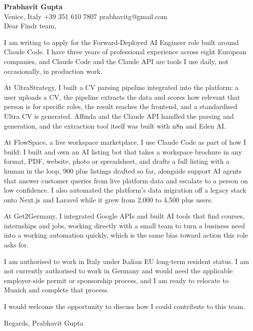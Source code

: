 \documentclass[a4paper,10.5pt]{article}
\begin{document}
\textbf{Prabhavit Gupta}\\
Venice, Italy \textbar{} +39 351 610 7807 \textbar{} prabhavitg@gmail.com\\[10pt]
Dear Findr team,

I am writing to apply for the Forward-Deployed AI Engineer role built around Claude Code. I have three years of professional experience across eight European companies, and Claude Code and the Claude API are tools I use daily, not occasionally, in production work.

At UltraStrategy, I built a CV parsing pipeline integrated into the platform: a user uploads a CV, the pipeline extracts the data and scores how relevant that person is for specific roles, the result reaches the frontend, and a standardised Ultra CV is generated. Affinda and the Claude API handled the parsing and generation, and the extraction tool itself was built with n8n and Eden AI.

At FlowSpace, a live workspace marketplace, I use Claude Code as part of how I build: I built and own an AI listing bot that takes a workspace brochure in any format, PDF, website, photo or spreadsheet, and drafts a full listing with a human in the loop, 900 plus listings drafted so far, alongside support AI agents that answer customer queries from live platform data and escalate to a person on low confidence. I also automated the platform's data migration off a legacy stack onto Next.js and Laravel while it grew from 2,000 to 4,500 plus users.

At Get2Germany, I integrated Google APIs and built AI tools that find courses, internships and jobs, working directly with a small team to turn a business need into a working automation quickly, which is the same bias toward action this role asks for.

I am authorised to work in Italy under Italian EU long-term resident status. I am not currently authorised to work in Germany and would need the applicable employer-side permit or sponsorship process, and I am ready to relocate to Munich and complete that process.

I would welcome the opportunity to discuss how I could contribute to this team.

Regards,
Prabhavit Gupta
\end{document}

